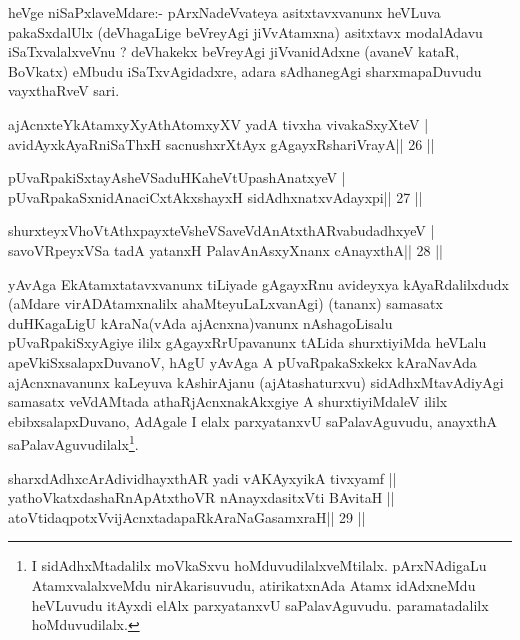 \begin{artha}
heVge niSaPxlaveMdare:- pArxNadeVvateya asitxtavxvanunx heVLuva  pakaSxdalUlx (deVhagaLige beVreyAgi jiVvAtamxna) asitxtavx modalAdavu  iSaTxvalalxveVnu ? deVhakekx beVreyAgi jiVvanidAdxne (avaneV kataR, BoVkatx) eMbudu iSaTxvAgidadxre, adara sAdhanegAgi sharxmapaDuvudu vayxthaRveV sari.
\end{artha}


\begin{shl}
ajAcnxteYkAtamxyXyAthAtomxyXV yadA tivxha vivakaSxyXteV |
avidAyxkAyaRniSaThxH sacnushxrXtAyx gAgayxRshariVrayA\hfill || 26 ||
\end{shl}

\begin{shl}
pUvaRpakiSxtayA\s sheVSaduHKaheVtUpashAnatxyeV |
pUvaRpakaSxnidAnaciCxtAkxshayxH sidAdhxnatxvAdayxpi\hfill || 27 ||
\end{shl}

\begin{shl}
shurxteyxVhoVtAthxpayxteV\s sheVSaveVdAnAtxthARvabudadhxyeV |
savoVR\s peyxVSa tadA yatanxH PalavAnAsxyXnanx cAnayxthA\hfill || 28 ||
\end{shl}

\begin{artha}
yAvAga EkAtamxtatavxvanunx tiLiyade gAgayxRnu avideyxya kAyaRdalilxdudx (aMdare \-virADAtamxnalilx ahaMteyuLaLxvanAgi) (tananx) samasatx  duHKagaLigU kAraNa\-(vAda ajAcnxna)vanunx nAshagoLisalu pUvaRpakiSxyAgiye  ililx gAgayxRrUpavanunx tALida shurxtiyiMda heVLalu  apeVkiSxsalapxDuvanoV, hAgU yAvAga A pUvaRpakaSxkekx kAraNavAda ajAcnxnavanunx kaLeyuva kAshirAjanu (ajAtashaturxvu) sidAdhxMtavAdiyAgi samasatx veVdAMtada athaRjAcnxnakAkxgiye A shurxtiyiMdaleV ililx ebibxsalapxDuvano, AdAgale I elalx parxyatanxvU saPalavAguvudu, anayxthA saPalavAguvudilalx\footnote[2]{I sidAdhxMtadalilx moVkaSxvu hoMduvudilalxveMtilalx. pArxNAdigaLu AtamxvalalxveMdu nirAkarisuvudu, atirikatxnAda Atamx idAdxneMdu heVLuvudu itAyxdi elAlx parxyatanxvU saPalavAguvudu. paramatadalilx hoMduvudilalx.}.
\end{artha}

\begin{shl}
sharxdAdhxcArAdividhayxthAR yadi vA\s\s KAyxyikA tivxyamf ||
yathoVkatxdashaRnApAtxthoVR nAnayxdasitxVti BAvitaH ||
atoV\s tidaqpotxV\s vijAcnxtadapaRkAraNaGasamxraH\hfill || 29 ||
\end{shl}

